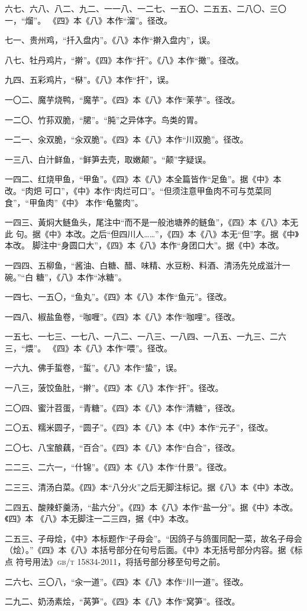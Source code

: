 六七、六八、八二、九二、一一八、一二七、一五〇、二五五、二八〇、三〇一，“熘”。
《四》本《八》本作“溜”。径改。

七一、贵州鸡，“扦入盘内”。《八》本作“擀入盘内”，误。

八七、牡丹鸡片，“擀”。《四》本作“扞”。《八》本作“撖”。径改。

九四、五彩鸡片，“㮟”。《八》本作“扞”，误。

一〇二、魔芋烧鸭，“魔芋”。《四》本《八》本作“茉芋”。径改。

一二〇、竹荪双脆，“𬂁”。“肫”之异体字。鸟类的胃。

一二一、汆双脆，“汆双脆”。《四》本《八》本作“川双脆”。径改。

一三八、白汁鲜鱼，“鲜笋去壳，取嫩颠”。“颠”字疑误。

一四二、红烧甲鱼，“甲鱼”。《四》本《八》本全篇皆作“足鱼”。据《中》本改。“肉𤆵
可口”，《中》本作“肉烂可口”。“但须注意甲鱼肉不可与苋菜同食”，“甲鱼肉”《中》
本作“龟鳖肉”。

一四三、黃焖大鲢鱼头，尾注中“而不是一般池塘养的鲢鱼”，《四》本《八》本无此
句。据《中》本改。之后“但四川人……”，《四》本《八》本无“但”字。据《中》本改。
脚注中“身圆口大”，《四》本《八》本作“身团口大”。据《中》本改。

一四四、五柳鱼，“酱油、白糖、醋、味精、水豆粉、料酒、清汤先兑成滋汁一碗。”“白
糖”，《八》本作“冰糖”。

一四七、一五〇，“鱼丸”。《四》本《八》本作“鱼元”。径改。

一四八、椒盐鱼卷，“咖喱”。《四》本《八》本作“咖哩”。径改。

一五七、一七三、一七八、一八二、一八三、一八四、一八五、一九三、二六三，“煨”。
《四》本《八》本作“喂”。径改。

一六九、佛手蜇卷，“蜇”。《八》本作“蛰”，误。

一八三，菠饺鱼肚，“擀”。《四》本《八》本作“扞”。径改。

二〇四、蜜汁苕蛋，“青糖”。《四》本《八》本作“清糖”，径改。

二〇五、糯米圆子，“圆子”。《四》本《八》本《中》本作“元子”，径改。

二〇七、八宝酿藕，“百合”。《四》本《八》本作“白合”，径改。

二二三、二六一，“什锦”。《四》本《八》本作“什景”。径改。

二三三、清汤白菜。《四》本“八分火”之后无脚注标记。据《八》本《中》本改。

二四五、酸辣虾羹汤，“盐六分”。《四》本《八》本作“盐一分”。据《中》本改。《四》本
《八》本无脚注一二三四，据《中》本改。

二五三、子母烩，《中》本标题作“子母会”。“因鸽子与鸽蛋同配一菜，故名子母会
（烩）。”《四》本《八》本括号部分在句号后面。《中》本无括号部分内容。据《标点
符号用法》\textsc{gb/t 15834-2011}，将括号部分移至句号之前。

二六七、三〇八，“汆一道”。《四》本《八》本作“川一道”。径改。

二九二、奶汤素烩，“莴笋”。《四》本《八》本作“窝笋”。径改。

\endgroup%

